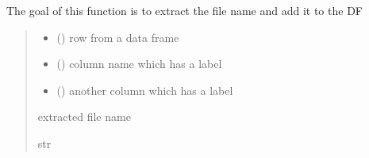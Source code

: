 \documentclass[letterpaper,10pt,english]{sphinxmanual}
\begin{document}
\begin{fulllineitems}
\label{\detokenize{auxilary_functions:auxilary_functions.file_name_extract}}
\pysigstartsignatures
{}
\pysigstopsignatures
\sphinxAtStartPar
The goal of this function is to extract the file name and add it to the DF
\begin{quote}\begin{description}
\begin{itemize}
\item {} 
\sphinxAtStartPar
{} () \textendash{} row from a data frame

\item {} 
\sphinxAtStartPar
{} () \textendash{} column name which has a label

\item {} 
\sphinxAtStartPar
{} () \textendash{} another column which has a label

\end{itemize}

\sphinxAtStartPar
extracted file name

\sphinxAtStartPar
str

\end{description}\end{quote}

\end{fulllineitems}

\end{document}
